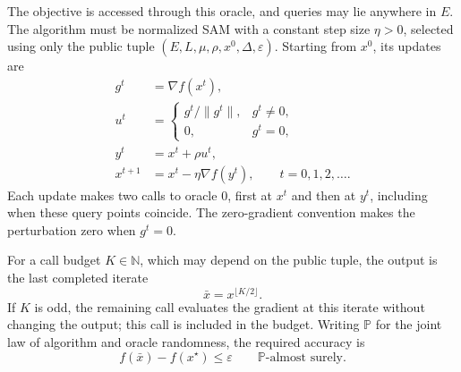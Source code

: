 \documentclass[10pt]{article}
\theoremstyle{definition}
\begin{document}
The objective is accessed through this oracle, and queries may lie anywhere in $E$. The algorithm must be normalized SAM with a constant step size $\eta>0$, selected using only the public tuple $(E,L,\mu,\rho,x^0,\Delta,\varepsilon)$. Starting from $x^0$, its updates are
\[
\begin{aligned}
g^t &= \nabla f(x^t),\\
u^t &=
\begin{cases}
g^t/\|g^t\|, & g^t\neq0,\\
0, & g^t=0,
\end{cases}\\
y^t &= x^t+\rho u^t,\\
x^{t+1} &= x^t-\eta\nabla f(y^t),
\qquad t=0,1,2,\ldots.
\end{aligned}
\]
Each update makes two calls to oracle $0$, first at $x^t$ and then at $y^t$, including when these query points coincide. The zero-gradient convention makes the perturbation zero when $g^t=0$.

For a call budget $K\in\mathbb{N}$, which may depend on the public tuple, the output is the last completed iterate
\[
\bar{x}=x^{\lfloor K/2\rfloor}.
\]
If $K$ is odd, the remaining call evaluates the gradient at this iterate without changing the output; this call is included in the budget. Writing $\mathbb{P}$ for the joint law of algorithm and oracle randomness, the required accuracy is
\[
f(\bar{x})-f(x^\star)\leq\varepsilon
\qquad \mathbb{P}\text{-almost surely}.
\]
\end{document}
